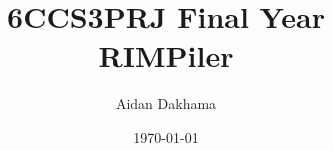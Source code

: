 \documentclass[11pt]{informatics-report}
\title{6CCS3PRJ Final Year\\\vspace{0.2cm}RIMPiler}
\author{Aidan Dakhama}
\date{\today}
\begin{document}
\createFrontMatter
\onehalfspacing
\tableofcontents
\doublespacing

\renewcommand{\bibsection}{\chapter{Bibliography}}















\appendix



\end{document}

